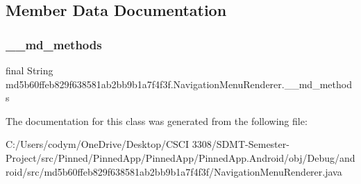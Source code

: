 \subsection{Member Data Documentation}
\mbox{\label{classmd5b60ffeb829f638581ab2bb9b1a7f4f3f_1_1_navigation_menu_renderer_a0f4bfebe2cdfd607a2a7599e832cfbdc}} 
\subsubsection{\texorpdfstring{\+\_\+\+\_\+md\+\_\+methods}{\_\_md\_methods}}
{\footnotesize\ttfamily final String md5b60ffeb829f638581ab2bb9b1a7f4f3f.\+Navigation\+Menu\+Renderer.\+\_\+\+\_\+md\+\_\+methods\hspace{0.3cm}{\ttfamily [static]}}



The documentation for this class was generated from the following file\+:\begin{DoxyCompactItemize}
\item 
C\+:/\+Users/codym/\+One\+Drive/\+Desktop/\+C\+S\+C\+I 3308/\+S\+D\+M\+T-\/\+Semester-\/\+Project/src/\+Pinned/\+Pinned\+App/\+Pinned\+App/\+Pinned\+App.\+Android/obj/\+Debug/android/src/md5b60ffeb829f638581ab2bb9b1a7f4f3f/Navigation\+Menu\+Renderer.\+java\end{DoxyCompactItemize}
